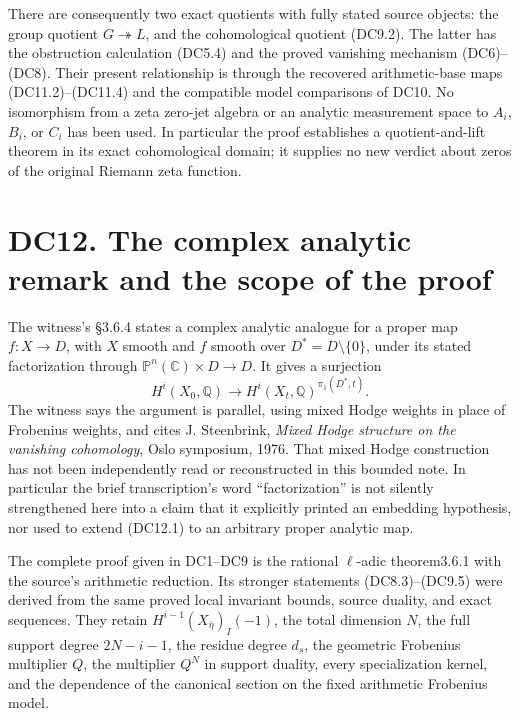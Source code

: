 \documentclass[
]{report}
\begin{document}
There are consequently two exact quotients with fully stated source
objects: the group quotient \(G\twoheadrightarrow L\), and the
cohomological quotient (DC9.2). The latter has the obstruction
calculation (DC5.4) and the proved vanishing mechanism (DC6)--(DC8).
Their present relationship is through the recovered arithmetic-base maps
(DC11.2)--(DC11.4) and the compatible model comparisons of DC10. No
isomorphism from a zeta zero-jet algebra or an analytic measurement
space to \(A_i\), \(B_i\), or \(C_i\) has been used. In particular the
proof establishes a quotient-and-lift theorem in its exact cohomological
domain; it supplies no new verdict about zeros of the original Riemann
zeta function.

\section{DC12. The complex analytic remark and the scope of the
proof}\label{dc12.-the-complex-analytic-remark-and-the-scope-of-the-proof}

The witness's §3.6.4 states a complex analytic analogue for a proper map
\(f:X\to D\), with \(X\) smooth and \(f\) smooth over
\(D^*=D\setminus\{0\}\), under its stated factorization through
\(\mathbb P^n(\mathbb C)\times D\to D\). It gives a surjection \[
H^i(X_0,\mathbb Q)\longrightarrow
 H^i(X_t,\mathbb Q)^{\pi_1(D^*,t)}.
\tag{DC12.1}
\] The witness says the argument is parallel, using mixed Hodge weights
in place of Frobenius weights, and cites J. Steenbrink, \emph{Mixed
Hodge structure on the vanishing cohomology}, Oslo symposium, 1976. That
mixed Hodge construction has not been independently read or
reconstructed in this bounded note. In particular the brief
transcription's word ``factorization'' is not silently strengthened here
into a claim that it explicitly printed an embedding hypothesis, nor
used to extend (DC12.1) to an arbitrary proper analytic map.

The complete proof given in DC1--DC9 is the rational \(\ell\)-adic
theorem3.6.1 with the source's arithmetic reduction. Its stronger
statements (DC8.3)--(DC9.5) were derived from the same proved local
invariant bounds, source duality, and exact sequences. They retain
\(H^{i-1}(X_{\bar\eta})_I(-1)\), the total dimension \(N\), the full
support degree \(2N-i-1\), the residue degree \(d_s\), the geometric
Frobenius multiplier \(Q\), the multiplier \(Q^N\) in support duality,
every specialization kernel, and the dependence of the canonical section
on the fixed arithmetic Frobenius model.
\end{document}
